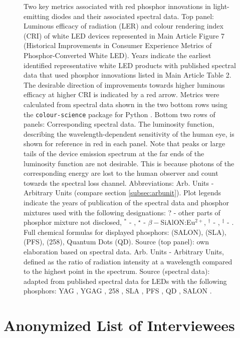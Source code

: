 \documentclass[10pt]{article}
\begin{document}
\begin{figure}[H]
	\caption{Two key metrics associated with red phosphor innovations in light-emitting diodes and their associated spectral data. Top panel: Luminous efficacy of radiation (LER) and colour rendering index (CRI) of white LED devices represented in Main Article Figure 7 (Historical Improvements in Consumer Experience Metrics of Phosphor-Converted White LED). Years indicate the earliest identified representative white LED products with published spectral data that used phosphor innovations listed in Main Article Table 2. The desirable direction of improvements towards higher luminous efficacy at higher CRI is indicated by a red arrow. Metrics were calculated from spectral data shown in the two bottom rows using the \texttt{colour-science} package for Python \cite{colour-science_software}. Bottom two rows of panels: Corresponding spectral data. The luminosity function, describing the wavelength-dependent sensitivity of the human eye, is shown for reference in red in each panel. Note that peaks or large tails of the device emission spectrum at the far ends of the luminosity function are not desirable. This is because photons of the corresponding energy are lost to the human observer and count towards the spectral loss channel. Abbreviations: Arb. Units - Arbitrary Units (compare section \cref{subsec:arbunit}). Plot legends indicate the years of publication of the spectral data and phosphor mixtures used with the following designations: ? -  other parts of phosphor mixture not disclosed, $^*$ - , $^\star$ - $\beta-$SiAlON:Eu$^{2+}$, $^\dagger$ - , $^\ddagger$ - . Full chemical formulas for displayed phosphors: (SALON),  (SLA),  (PFS),  (258), Quantum Dots (QD). Source (top panel): own elaboration based on spectral data. Arb. Units - Arbitrary Units, defined as the ratio of radiation intensity at a wavelength compared to the highest point in the spectrum. Source (spectral data): adapted from published spectral data for LEDs with the following phosphors: YAG \cite{bando1998development}, YGAG \cite{Mueller2002}, 258 \cite{MuellerMach2005}, SLA \cite{Pust2014}, PFS \cite{trigain_spectrum}, QD \cite{lumileds2016qd}\cite{osram2019qd}, SALON \cite{Hoerder2019}.}
\label{fig:phosphor_spectrum}
\end{figure}

\section{Anonymized List of Interviewees}
\end{document}
